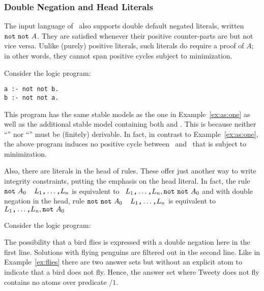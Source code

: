 \subsubsection{Double Negation and Head Literals}\label{subsec:gringo:double}

The input language of \gringo\ also supports double default negated literals,
written $\texttt{not}~\texttt{not}~A$.
They are satisfied whenever their positive counter-parts are but not vice versa.
Unlike (purely) positive literals,
such literals do require a proof of $A$;
in other words, they cannot span positive cycles subject to minimization.

Consider the logic program:
\begin{lstlisting}[numbers=none]
a :- not not b.
b :- not not a.
\end{lstlisting}
%
This program has the same stable models as the one in Example~\ref{ex:as:one}
as well as the additional stable model containing both  and .
This is because neither ``'' nor ``'' must be (finitely) derivable.
In fact, in contrast to Example~\ref{ex:as:one},
the above program induces no positive cycle between~ and~ that is subject to minimization.

Also, there are literals in the head of rules.
These offer just another way to write integrity constraints,
putting the emphasis on the head literal.
In fact, the rule
\(\texttt{not}~A_0\)~\code{:-}~\(L_1\text{\texttt{,}}\dots\text{\texttt{,}}L_n\)
is equivalent to
\code{:-}~\(L_1\text{\texttt{,}}\dots\text{\texttt{,}}L_n,\texttt{not}~\texttt{not}~A_0\)
and with double negation in the head, rule
\(\texttt{not}~\texttt{not}~A_0\)~\code{:-}~\(L_1\text{\texttt{,}}\dots\text{\texttt{,}}L_n\)
is equivalent to
\code{:-}~\(L_1\text{\texttt{,}}\dots\text{\texttt{,}}L_n,\texttt{not}~A_0\)

\begin{example}\label{ex:as:flynn}
Consider the logic program:


The possibility that a bird flies is expressed with a double negation here in the first line.
Solutions with flying penguins are filtered out in the second line.
Like in Example~\ref{ex:flies} there are two answer sets
but without an explicit atom to indicate that a bird does not fly.
Hence, the answer set where Tweety does not fly contains no atoms over predicate /$1$.
\eexample
\end{example}


